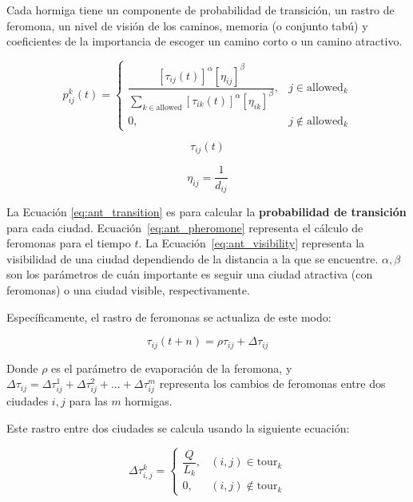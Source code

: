 \documentclass[titlepage, letterpaper]{article}
\begin{document}
Cada hormiga tiene un componente de probabilidad de transición, un rastro de feromona, un nivel de visión de los caminos, memoria (o conjunto tabú) y coeficientes de la importancia de escoger un camino corto o un camino atractivo.

\begin{equation}
\label{eq:ant_transition}
p^k_{ij}(t) =
\begin{cases}
\dfrac{[\tau_{ij}(t)]^{\alpha}[\eta_{ij}]^{\beta}}{\sum_{k \in \text{allowed}}[\tau_{ik}(t)]^{\alpha}[\eta_{ik}]^{\beta}}, & j \in \text{allowed}_k \\[2ex]
0, & j \not \in \text{allowed}_k
\end{cases}
\end{equation}

\begin{equation}
\label{eq:ant_pheromone}
    \tau_{ij}(t)
\end{equation}

\begin{equation}
\label{eq:ant_visibility}
\eta_{ij} = \dfrac{1}{d_{ij}}
\end{equation}

La Ecuación \ref{eq:ant_transition} es para calcular la \textbf{probabilidad de transición} para cada ciudad.
Ecuación~\ref{eq:ant_pheromone} representa el cálculo de feromonas para el tiempo $t$.
La Ecuación~\ref{eq:ant_visibility} representa la visibilidad de una ciudad dependiendo de la distancia a la que se encuentre.
$\alpha, \beta$ son los parámetros de cuán importante es seguir una ciudad atractiva (con feromonas) o una ciudad visible, respectivamente.

Específicamente, el rastro de feromonas se actualiza de este modo:

\begin{equation}
\label{eq:ant_phero_update_global}
    \tau_{ij}(t+n) = \rho \tau_{ij} + \Delta \tau_{ij}
\end{equation}

Donde $\rho$ es el parámetro de evaporación de la feromona, y $\Delta\tau_{ij} = \Delta\tau^1_{ij} + \Delta\tau^2_{ij} + \dots + \Delta\tau^m_{ij}$ representa los cambios de feromonas entre dos ciudades $i,j$ para las $m$ hormigas.

Este rastro entre dos ciudades se calcula usando la siguiente ecuación:

\begin{equation}
\label{eq:ant_phero_update_p_ant}
\Delta\tau^k_{i,j} =
\begin{cases}
\dfrac{Q}{L_k}, & (i,j) \in \text{tour}_k \\[2ex]
0, & (i,j) \not \in \text{tour}_k
\end{cases}
\end{equation}
\end{document}
